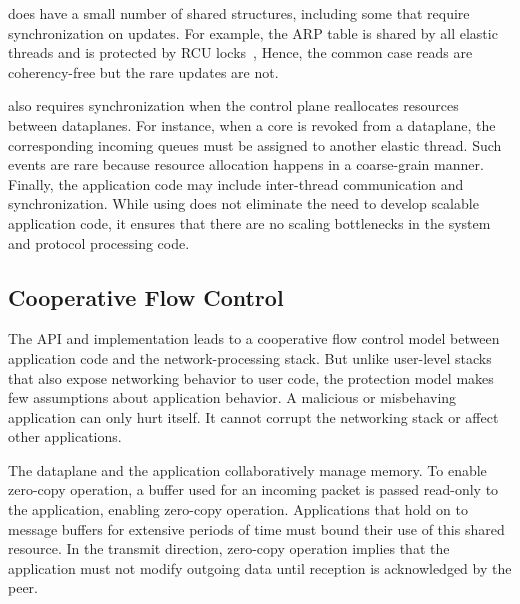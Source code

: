 



\ix does have a small number of shared structures, including some that
require synchronization on updates.  For example, the ARP table is
shared by all elastic threads and is protected by RCU
locks~\cite{mckenney1998read}, Hence, the common case reads are
coherency-free but the rare updates are not.
%

\ix also requires
synchronization when the control plane reallocates resources between
dataplanes.  For instance, when a core is revoked from a dataplane,
the corresponding incoming queues must be assigned to another elastic
thread. Such events are rare because resource allocation happens in a
coarse-grain manner. Finally, the application code may include
inter-thread communication and synchronization. While using \ix does
not eliminate the need to develop scalable application code, it
ensures that there are no scaling bottlenecks in the system and
protocol processing code. 

\subsection{Cooperative Flow Control}
\label{sec:impl:coop}

The \ix API and implementation leads to a cooperative flow control
model between application code and the network-processing stack.  But
unlike user-level stacks that also expose networking behavior to user
code,
the \ix protection model makes few assumptions about application
behavior. A malicious or misbehaving application can only hurt
itself. It cannot corrupt the networking stack or affect other
applications.

The \ix dataplane and the application collaboratively manage
memory. To enable zero-copy operation, a buffer used for an incoming
packet is passed read-only to the application, enabling zero-copy
operation. Applications that hold on to message buffers for extensive
periods of time must bound their use of this shared resource.  In the
transmit direction, zero-copy operation implies that the application
must not modify outgoing data
until reception is
acknowledged by the peer. %

